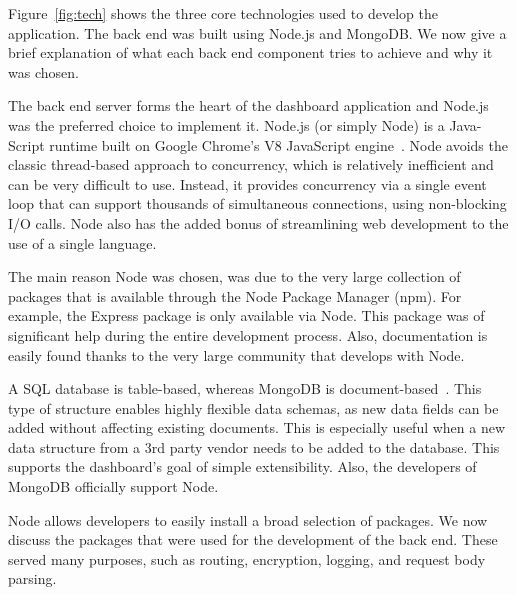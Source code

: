         Figure~\ref{fig:tech} shows the three core technologies used to develop the application. The back end was built using Node.js and MongoDB\@. We now give a brief explanation of what each back end component tries to achieve and why it was chosen.


            The back end server forms the heart of the dashboard application and Node.js was the preferred choice to implement it. Node.js (or simply Node) is a Java-Script runtime built on Google Chrome's V8 JavaScript engine~\cite{NodeJS}. Node avoids the classic thread-based approach to concurrency, which is relatively inefficient and can be very difficult to use. Instead, it provides concurrency via a single event loop that can support thousands of simultaneous connections, using non-blocking I/O calls. Node also has the added bonus of streamlining web development to the use of a single language.
            
            The main reason Node was chosen, was due to the very large collection of packages that is available through the Node Package Manager (npm). For example, the Express package is only available via Node. This package was of significant help during the entire development process. Also, documentation is easily found thanks to the very large community that develops with Node.

            
            A SQL database is table-based, whereas MongoDB is document-based~\cite{MongoDB}. This type of structure enables highly flexible data schemas, as new data fields can be added without affecting existing documents. This is especially useful when a new data structure from a 3rd party vendor needs to be added to the database. This supports the dashboard's goal of simple extensibility. Also, the developers of MongoDB officially support Node.


            Node allows developers to easily install a broad selection of packages. We now discuss the packages that were used for the development of the back end. These served many purposes, such as routing, encryption, logging, and request body parsing. 


